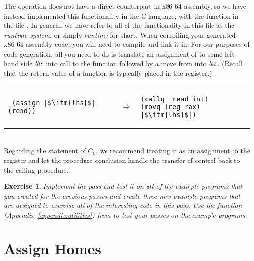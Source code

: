 \documentclass[11pt]{book}
\newtheorem{exercise}[theorem]{Exercise}
\begin{document}
The  operation does not have a direct counterpart in x86-64
assembly, so we have instead implemented this functionality in the C
language, with the function  in the file
. In general, we have refer to all of the
functionality in this file as the \emph{runtime system}, or simply
\emph{runtime} for short. When compiling your generated x86-64
assembly code, you will need to compile  and link it
in. For our purposes of code generation, all you need to do is
translate an assignment of  to some left-hand side
$\mathit{lhs}$ into call to the  function followed by a
move from  into $\mathit{lhs}$. (Recall that the return value
of a function is typically placed in the  register.)  \\
\begin{tabular}{lll}
\begin{minipage}{0.4\textwidth}
\begin{lstlisting}
 (assign |$\itm{lhs}$| (read))
\end{lstlisting}
\end{minipage}
&
$\Rightarrow$
&
\begin{minipage}{0.4\textwidth}
\begin{lstlisting}
(callq _read_int)
(movq (reg rax) |$\itm{lhs}$|)
\end{lstlisting}
\end{minipage}
\end{tabular} \\

Regarding the  statement of $C_0$, we recommend treating it
as an assignment to the  register and let the procedure
conclusion handle the transfer of control back to the calling
procedure.

\begin{exercise}
\normalfont
Implement the  pass and test it on all of the
example programs that you created for the previous passes and create
three new example programs that are designed to exercise all of the
interesting code in this pass. Use the  function
(Appendix~\ref{appendix:utilities}) from  to test
your passes on the example programs.
\end{exercise}

\section{Assign Homes}
\label{sec:assign-s0}
\end{document}
